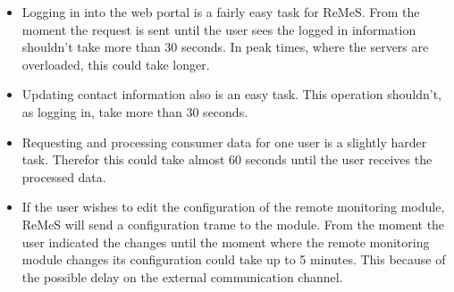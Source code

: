 \begin{itemize}
\begin{itemize}
			\item Logging in into the web portal is a fairly easy task for ReMeS. From the moment the request is sent until
					the user sees the logged in information shouldn't take more than 30 seconds. In peak times, where the servers
					are overloaded, this could take longer.
			\item Updating contact information also is an easy task. This operation shouldn't, as logging in, take more than 30 seconds.
			\item Requesting and processing consumer data for one user is a slightly harder task. Therefor this could take almost 60 seconds
					until the user receives the processed data.
			\item If the user wishes to edit the configuration of the remote monitoring module, ReMeS will send a configuration trame to the 
					module. From the moment the user indicated the changes until the moment where the remote monitoring module changes its
					configuration could take up to 5 minutes. This because of the possible delay on the external communication channel.
		\end{itemize}
\end{itemize}